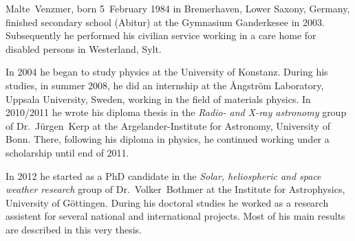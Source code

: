 


Malte~Venzmer, born 5~February 1984 in Bremerhaven, Lower Saxony, Germany, finished secondary school (Abitur) at the Gymnasium Ganderkesee in 2003. Subsequently he performed his civilian service working in a care home for disabled persons in Westerland, Sylt.

In 2004 he began to study physics at the University of Konstanz. During his studies, in summer 2008, he did an internship at the \AA{}ngström Laboratory, Uppsala University, Sweden, working in the field of materials physics. In 2010/2011 he wrote his diploma thesis in the \textit{Radio- and X-ray astronomy} group of Dr.~Jürgen~Kerp at the Argelander-Institute for Astronomy, University of Bonn. There, following his diploma in physics, he continued working under a scholarship until end of 2011.

In 2012 he started as a PhD candidate in the \textit{Solar, heliospheric and space weather research} group of Dr.~Volker~Bothmer at the Institute for Astrophysics, University of Göttingen. During his doctoral studies he worked as a research assistent for several national and international projects. Most of his main results are described in this very thesis.

